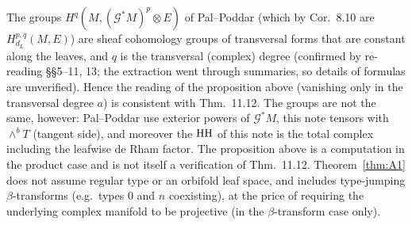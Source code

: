 \begin{rem}[\tQ]
The groups $H^q(M,(\mathcal G^*M)^p\otimes E)$ of Pal--Poddar (which by Cor.~8.10 are $H^{p,q}_{d_L}(M,E)$) are sheaf cohomology groups of transversal forms that are constant along the leaves, and $q$ is the transversal (complex) degree (confirmed by re-reading \S\S5--11, 13; the extraction went through summaries, so details of formulas are unverified). Hence the reading of the proposition above (vanishing only in the transversal degree $a$) is consistent with Thm.~11.12. The groups are not the same, however: Pal--Poddar use exterior powers of $\mathcal G^*M$, this note tensors with $\wedge^bT$ (tangent side), and moreover the $\mathrm{HH}$ of this note is the total complex including the leafwise de Rham factor. The proposition above is a computation in the product case and is not itself a verification of Thm.~11.12. Theorem~\ref{thm:A1} does not assume regular type or an orbifold leaf space, and includes type-jumping $\beta$-transforms (e.g.\ types $0$ and $n$ coexisting), at the price of requiring the underlying complex manifold to be projective (in the $\beta$-transform case only).
\end{rem}

